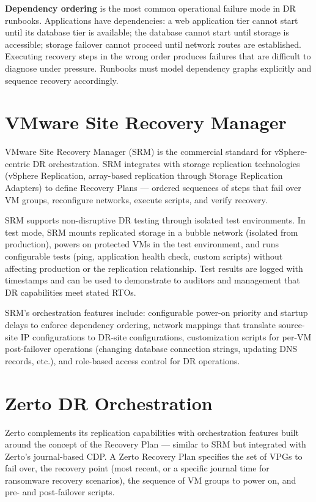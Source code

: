 \textbf{Dependency ordering} is the most common operational failure mode in DR runbooks. Applications have dependencies: a web application tier cannot start until its database tier is available; the database cannot start until storage is accessible; storage failover cannot proceed until network routes are established. Executing recovery steps in the wrong order produces failures that are difficult to diagnose under pressure. Runbooks must model dependency graphs explicitly and sequence recovery accordingly.

\section{VMware Site Recovery Manager}
VMware Site Recovery Manager (SRM) is the commercial standard for vSphere-centric DR orchestration. SRM integrates with storage replication technologies (vSphere Replication, array-based replication through Storage Replication Adapters) to define Recovery Plans --- ordered sequences of steps that fail over VM groups, reconfigure networks, execute scripts, and verify recovery.

SRM supports non-disruptive DR testing through isolated test environments. In test mode, SRM mounts replicated storage in a bubble network (isolated from production), powers on protected VMs in the test environment, and runs configurable tests (ping, application health check, custom scripts) without affecting production or the replication relationship. Test results are logged with timestamps and can be used to demonstrate to auditors and management that DR capabilities meet stated RTOs.

SRM's orchestration features include: configurable power-on priority and startup delays to enforce dependency ordering, network mappings that translate source-site IP configurations to DR-site configurations, customization scripts for per-VM post-failover operations (changing database connection strings, updating DNS records, etc.), and role-based access control for DR operations.

\section{Zerto DR Orchestration}
Zerto complements its replication capabilities with orchestration features built around the concept of the Recovery Plan --- similar to SRM but integrated with Zerto's journal-based CDP. A Zerto Recovery Plan specifies the set of VPGs to fail over, the recovery point (most recent, or a specific journal time for ransomware recovery scenarios), the sequence of VM groups to power on, and pre- and post-failover scripts.

